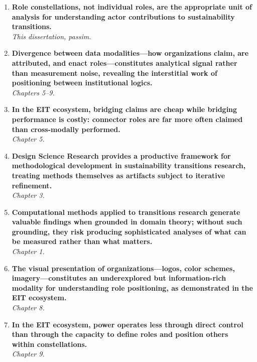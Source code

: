 \documentclass[../main.tex]{subfiles}
\begin{document}
\begin{enumerate}[leftmargin=1.5cm, itemsep=0.8em, label=\textbf{\Roman*.}]

\item \textbf{Role constellations, not individual roles, are the appropriate unit of analysis for understanding actor contributions to sustainability transitions.}\\
\textit{This dissertation, passim.}

\item \textbf{Divergence between data modalities---how organizations claim, are attributed, and enact roles---constitutes analytical signal rather than measurement noise, revealing the interstitial work of positioning between institutional logics.}\\
\textit{Chapters 5--9.}

\item \textbf{In the EIT ecosystem, bridging claims are cheap while bridging performance is costly: connector roles are far more often claimed than cross-modally performed.}\\
\textit{Chapter 5.}

\item \textbf{Design Science Research provides a productive framework for methodological development in sustainability transitions research, treating methods themselves as artifacts subject to iterative refinement.}\\
\textit{Chapter 3.}

\item \textbf{Computational methods applied to transitions research generate valuable findings when grounded in domain theory; without such grounding, they risk producing sophisticated analyses of what can be measured rather than what matters.}\\
\textit{Chapter 1.}

\item \textbf{The visual presentation of organizations---logos, color schemes, imagery---constitutes an underexplored but information-rich modality for understanding role positioning, as demonstrated in the EIT ecosystem.}\\
\textit{Chapter 8.}

\item \textbf{In the EIT ecosystem, power operates less through direct control than through the capacity to define roles and position others within constellations.}\\
\textit{Chapter 9.}


\end{enumerate}
\end{document}
